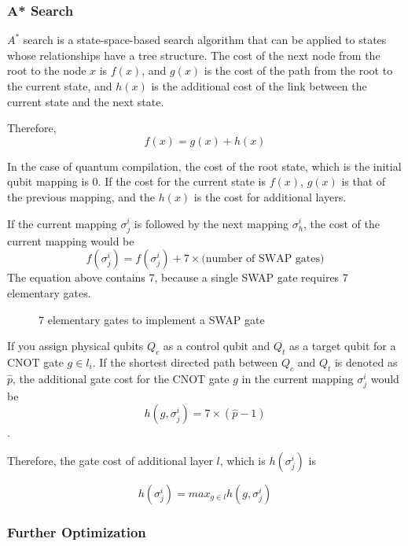 \subsubsection{A* Search}
$A^{*}$ search is a state-space-based search algorithm that can be applied to states whose relationships have a tree structure.  The cost of the next node from the root to the node $x$ is $f(x)$, and $g(x)$ is the cost of the path from the root to the current state, and $h(x)$ is the additional cost of the link between the current state and the next state.　

Therefore, $$f(x) = g(x) + h(x)$$

In the case of quantum compilation, the cost of the root state, which is the initial qubit mapping is 0. If the cost for the current state is $f(x)$, $g(x)$ is that of the previous mapping, and the $h(x)$ is the cost for additional layers.

If the current mapping $\sigma^i_j$ is followed by the next mapping  $\sigma^i_h$, the cost of the current mapping would be
$$ f(\sigma^i_j) = f(\sigma^i_j) + 7 \times \textrm{(number of SWAP gates)} $$
The equation above contains 7, because a single SWAP gate requires 7 elementary gates.

\begin{figure}[ht]
	\begin{center}
		\caption{7 elementary gates to implement a SWAP gate}
	\end{center}
\end{figure}

If you assign physical qubits $Q_c$ as a control qubit and $Q_t$ as a target qubit for a CNOT gate $g \in l_i$.  If the shortest directed path between $Q_c$ and $Q_t$ is denoted as $\hat{p}$, the additional gate cost for the CNOT gate $g$ in the current mapping $\sigma^i_j$ would be $$h(g, \sigma^i_j) = 7 \times (\hat{p} - 1)$$.

Therefore, the gate cost of additional layer $l$, which is $h(\sigma^i_j)$ is

$$ h(\sigma^i_j) = max_{g \in l} h(g, \sigma^i_j)$$

\subsubsection{Further Optimization}

